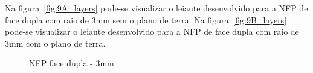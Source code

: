 Na figura~\ref{fig:9A_layers} pode-se visualizar o leiaute desenvolvido para a NFP de face dupla com raio de 3mm sem o plano de terra. Na figura~\ref{fig:9B_layers} pode-se visualizar o leiaute desenvolvido para a NFP de face dupla com raio de 3mm com o plano de terra. 
\begin{figure}[htb!]
	\centering
 	\caption{NFP face dupla - 3mm}
\end{figure}

